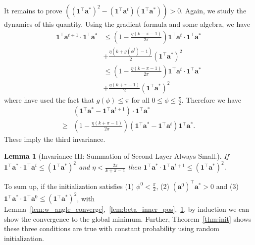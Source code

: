 \documentclass{article}
\newcommand{\secondlayer}{a}
\newcommand{\vect}[1]{\mathbf{#1}}
\newtheorem{lem}{Lemma}[section]
\begin{document}
It remains to prove $\left(\left(\vect{1}^\top \vect{\secondlayer}^*\right)^2 - \left(\vect{1}^\top \vect{\secondlayer}^t\right)\left(\vect{1}^\top \vect{\secondlayer}^*\right)\right) > 0$.
Again, we study the dynamics of this quantity.
Using the gradient formula and some algebra, we have \begin{align*}
\vect{1}^\top \vect{\secondlayer}^{t+1} \cdot \vect{1}^\top \vect{\secondlayer}^*
&\le \left(1-\frac{\eta\left(k-\pi-1\right)}{2\pi}\right)\vect{1}^\top \vect{\secondlayer}^{t}\cdot\vect{1}^\top\vect{\secondlayer}^* \\
&+ \frac{\eta\left(k+g(\phi^t)-1\right)}{2}\left(\vect{1}^\top \vect{\secondlayer}^*\right)^2 \\
& \le \left(1-\frac{\eta\left(k-\pi-1\right)}{2\pi}\right)\vect{1}^\top \vect{\secondlayer}^{t}\cdot\vect{1}^\top\vect{\secondlayer}^* \\
&+ \frac{\eta\left(k+\pi-1\right)}{2}\left(\vect{1}^\top \vect{\secondlayer}^*\right)^2
\end{align*}
where have used the fact that $g(\phi)\le \pi$ for all $0 \le \phi \le  \frac{\pi}{2}$.
Therefore we have \begin{align*}
	&\left(\vect{1}^\top\vect{\secondlayer}^*-\vect{1}^\top\vect{\secondlayer}^{t+1}\right)\cdot\vect{1}^\top \vect{\secondlayer}^*\\
	 \ge &\left(1-\frac{\eta(k+\pi-1)}{2\pi}\right)\left(\vect{1}^\top\vect{\secondlayer}^*-\vect{1}^\top\vect{\secondlayer}^{t}\right) \vect{1}^\top \vect{\secondlayer}^*.
\end{align*}
These imply the third invariance.
\begin{lem}[Invariance III: Summation of Second Layer Always Small.]\label{lem:sum_beta_converge}
If $\vect{1}^\top \vect{\secondlayer}^*\cdot\vect{1}^\top\vect{\secondlayer}^t \le \left(\vect{1}^\top \vect{\secondlayer}^*\right)^2$ and $\eta < \frac{2\pi}{k+\pi-1}$ then $\vect{1}^\top \vect{\secondlayer}^*\cdot\vect{1}^\top\vect{\secondlayer}^{t+1} \le \left(\vect{1}^\top \vect{\secondlayer}^*\right)^2$.
\end{lem}
To sum up, if the initialization satisfies (1) $\phi^0 < \frac{\pi}{2}$, (2) $\left(\vect{\secondlayer}^0\right)^\top \vect{\secondlayer}^* > 0$ and (3) $\vect{1}^\top \vect{\secondlayer}^*\cdot\vect{1}^\top\vect{\secondlayer}^0 \le \left(\vect{1}^\top \vect{\secondlayer}^*\right)^2$, with Lemma~\ref{lem:w_angle_converge},~\ref{lem:beta_inner_pos},~\ref{lem:sum_beta_converge}, by induction we can show the convergence to the global minimum.
Further, Theorem~\ref{thm:init} shows these three conditions are true with constant probability using random initialization.
\end{document}
